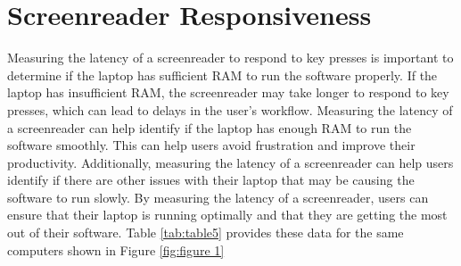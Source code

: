 \documentclass[14pt,letterpaper,twoside]{extreport}
\begin{document}
\pagebreak
\hypertarget{screenreader-response}{}\section{Screenreader Responsiveness}\label{screenreader-response}
Measuring the latency of a screenreader to respond to key presses is important to determine if the laptop has sufficient RAM to run the software properly. If the laptop has insufficient RAM, the screenreader may take longer to respond to key presses, which can lead to delays in the user’s workflow. Measuring the latency of a screenreader can help identify if the laptop has enough RAM to run the software smoothly. This can help users avoid frustration and improve their productivity. Additionally, measuring the latency of a screenreader can help users identify if there are other issues with their laptop that may be causing the software to run slowly. By measuring the latency of a screenreader, users can ensure that their laptop is running optimally and that they are getting the most out of their software. Table \ref{tab:table5} provides these data for the same computers shown in Figure \ref{fig:figure 1}
\end{document}
